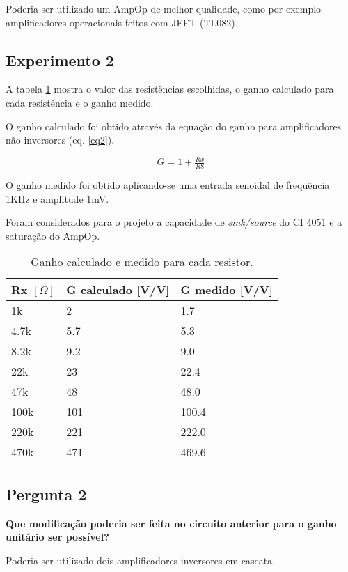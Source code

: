 Poderia ser utilizado um AmpOp de melhor qualidade, como por exemplo amplificadores operacionais feitos com JFET (TL082).

\subsection{Experimento 2}
A tabela \ref{tab2} mostra o valor das resistências escolhidas, o ganho calculado para cada resistência e o ganho medido.

O ganho calculado foi obtido através da equação do ganho para amplificadores não-inversores (eq. \ref{eq2}).

\begin{equation}
G = 1 +\tfrac{Rx}{R8}
\label{eq2}
\end{equation}

O ganho medido foi obtido aplicando-se uma entrada senoidal de frequência 1KHz e amplitude 1mV.

Foram considerados para o projeto a capacidade de \textit{sink/source} do CI 4051 e a saturação do AmpOp.

\begin{small}
\begin{table}[H]
\begin{center}
\caption{Ganho calculado e medido para cada resistor.}

\begin{tabular}{l|l|l}
\hline
Rx $[\Omega]$ & G calculado [V/V] & G medido [V/V]\\
\hline
1k & 2 & 1.7\\
\hline
4.7k &  5.7 & 5.3\\
\hline
8.2k & 9.2 & 9.0\\
\hline
22k & 23 & 22.4\\
\hline
47k & 48 & 48.0\\
\hline
100k & 101 & 100.4\\
\hline
220k & 221 & 222.0\\
\hline
470k & 471 & 469.6\\
\hline

\end{tabular}
\label{tab2}
\end{center}
\end{table}
\end{small}


\subsection{Pergunta 2}
\textbf{Que modificação poderia ser feita no circuito anterior para o ganho unitário ser possível?}

Poderia ser utilizado dois amplificadores inversores em cascata.